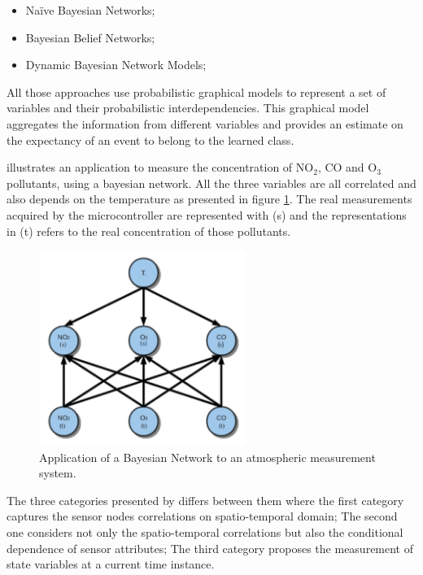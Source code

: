\begin{itemize}
	\setlength\itemsep{-0.5em}
	\item Na\"{i}ve Bayesian Networks;
	\item Bayesian Belief Networks;
	\item Dynamic Bayesian Network Models;	
\end{itemize}

All those approaches use probabilistic graphical models to represent a set of variables and their probabilistic interdependencies. 
This graphical model aggregates the information from different variables and provides an estimate on the expectancy of an event to belong to the learned class.

\cite{class:xiang:2016} illustrates an application to measure the concentration of NO$_2$, CO and O$_3$ pollutants, using a bayesian network. All the three variables are all correlated and also depends on the temperature as presented in figure \ref{fig:xiang2016}. The real measurements acquired by the microcontroller are represented with (s) and the representations in (t) refers to the real concentration of those pollutants.

\begin{figure}[h!]
	\centering
	\includegraphics[width=0.60\textwidth,keepaspectratio]{figures/xiang2016}
	\caption{Application of a Bayesian Network to an atmospheric measurement system. }
	\label{fig:xiang2016}
\end{figure}

The three categories presented by \cite{gen:zhang:2010} differs between them where the first category captures the sensor nodes correlations on spatio-temporal domain; 
The second one considers not only the spatio-temporal correlations but also the conditional dependence of sensor attributes;
The third category proposes the measurement of state variables at a current time instance.

